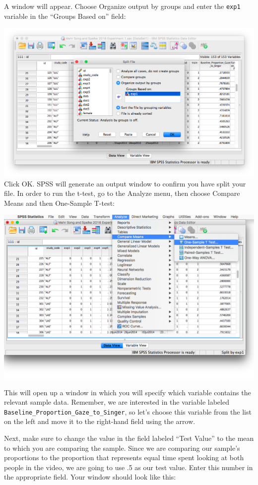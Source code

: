 \documentclass[
]{book}
\begin{document}
A window will appear. Choose {Organize output by groups} and enter the \texttt{exp1} variable in the ``Groups Based on'' field:

\includegraphics{img/6.4.13.png}
Click {OK}. SPSS will generate an output window to confirm you have split your file. In order to run the t-test, go to the {Analyze} menu, then choose {Compare Means} and then {One-Sample T-test}:

\includegraphics{img/6.4.14.png}

This will open up a window in which you will specify which variable contains the relevant sample data. Remember, we are interested in the variable labeled \texttt{Baseline\_Proportion\_Gaze\_to\_Singer}, so let's choose this variable from the list on the left and move it to the right-hand field using the arrow.

Next, make sure to change the value in the field labeled ``Test Value'' to the mean to which you are comparing the sample. Since we are comparing our sample's proportions to the proportion that represents equal time spent looking at both people in the video, we are going to use .5 as our test value. Enter this number in the appropriate field. Your window should look like this:
\end{document}
